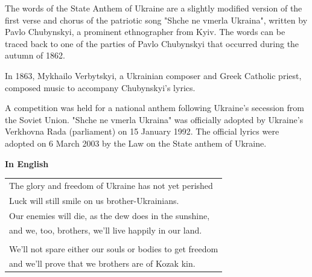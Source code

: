 \vspace{5mm}
The words of the State Anthem of Ukraine are a slightly modified version of the
first verse and chorus of the patriotic song "Shche ne vmerla Ukraina", 
written by Pavlo Chubynskyi, a prominent ethnographer from Kyiv.
The words can be traced back to one of the parties of Pavlo Chubynskyi
that occurred during the autumn of 1862.

In 1863, Mykhailo Verbytskyi, a Ukrainian composer and Greek Catholic priest, 
composed music to accompany Chubynskyi's lyrics.

A competition was held for a national anthem following Ukraine's secession from the Soviet Union.
"Shche ne vmerla Ukraina" was officially adopted by Ukraine's Verkhovna Rada (parliament) on 
15 January 1992. The official lyrics were adopted on 6 March 2003 by the
Law on the State anthem of Ukraine.

\textbf{In English}

\begin{center}
\begin{tabular}{l}
The glory and freedom of Ukraine has not yet perished\\
Luck will still smile on us brother-Ukrainians.\\
Our enemies will die, as the dew does in the sunshine,\\
and we, too, brothers, we'll live happily in our land.\\
\\
We'll not spare either our souls or bodies to get freedom\\
and we'll prove that we brothers are of Kozak kin.\\
\end{tabular}
\end{center}

\clearpage 

\newpage


